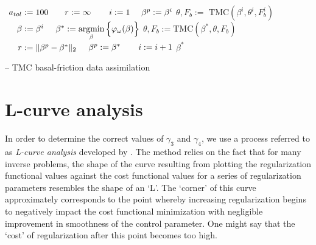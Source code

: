 \begin{algorithm}
  \begin{algorithmic}[1]
      \State $\phantom{\theta,F_b}\mathllap{a_{tol}} := 100$
      \State $\phantom{\theta,F_b}\mathllap{r} := \infty$
      \State $\phantom{\theta,F_b}\mathllap{i} := 1$
      \State $\phantom{\theta,F_b}\mathllap{\beta^p} := \beta^i$
      \State $\theta, F_b := \text{ TMC} \left( \beta^i, \theta^i, F_b^i \right)$
        \State $\phantom{\theta,F_b}\mathllap{\beta} := \beta^i$
        \State $\phantom{\theta, F_b}\mathllap{\beta^*} := \argminl_{\beta} \Big\{ \varphi_{\omega}(\beta) \Big\}$
        \State $\theta, F_b := \text{TMC} \left( \beta^*, \theta, F_b \right)$
        \State $\phantom{\theta, F_b}\mathllap{r} := \Vert \beta^p - \beta^* \Vert_{2}$
        \State $\phantom{\theta, F_b}\mathllap{\beta^p} := \beta^*$
        \State $\phantom{\theta, F_b}\mathllap{i} := i + 1$
      \EndWhile
      \State \Return $\beta^*$
    \EndFunction
  \end{algorithmic}
  \caption[Thermo-mechanically coupled data-assimilation]{ -- TMC basal-friction data assimilation}
  \label{tmc_da}
\end{algorithm}



\section{L-curve analysis} \label{ssn_l_curve}

In order to determine the correct values of $\gamma_3$ and $\gamma_4$, we use a process referred to as \emph{L-curve analysis} developed by \citet{hansen_1992}.  The method relies on the fact that for many inverse problems, the shape of the curve resulting from plotting the regularization functional values against the cost functional values for a series of regularization parameters resembles the shape of an `L'.  The `corner' of this curve approximately corresponds to the point whereby increasing regularization begins to negatively impact the cost functional minimization with negligible improvement in smoothness of the control parameter.  One might say that the `cost' of regularization after this point becomes too high.

